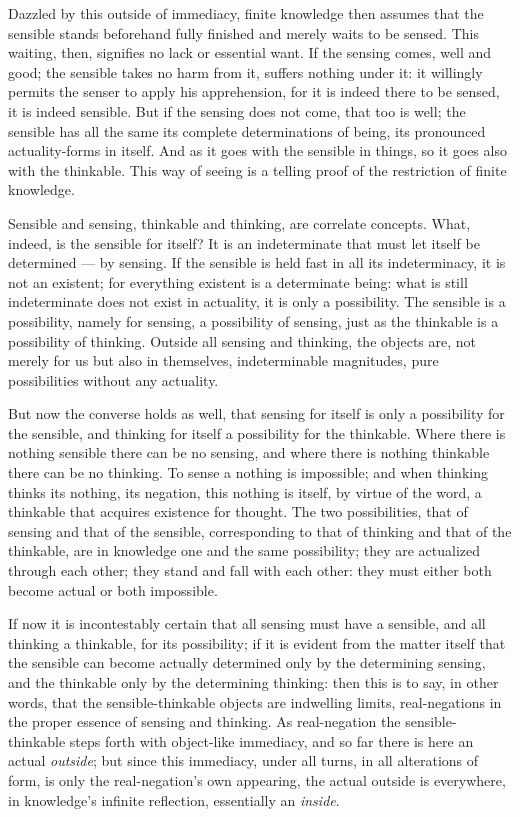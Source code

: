 \documentclass[12pt]{book}
\begin{document}
Dazzled by this outside of immediacy, finite knowledge then assumes
that the sensible stands beforehand fully finished and merely waits
to be sensed. This waiting, then, signifies no lack or essential
want. If the sensing comes, well and good; the sensible takes no
harm from it, suffers nothing under it: it willingly permits the
senser to apply his apprehension, for it is indeed there to be
sensed, it is indeed sensible. But if the sensing does not come,
that too is well; the sensible has all the same its complete
determinations of being, its pronounced actuality-forms in itself.
And as it goes with the sensible in things, so it goes also with the
thinkable. This way of seeing is a telling proof of the restriction
of finite knowledge.

Sensible and sensing, thinkable and thinking, are correlate
concepts. What, indeed, is the sensible for itself? It is an
indeterminate that must let itself be determined --- by sensing. If
the sensible is held fast in all its indeterminacy, it is not an
existent; for everything existent is a determinate being: what is
still indeterminate does not exist in actuality, it is only a
possibility. The sensible is a possibility, namely for sensing, a
possibility of sensing, just as the thinkable is a possibility of
thinking. Outside all sensing and thinking, the objects are, not
merely for us but also in themselves, indeterminable magnitudes,
pure possibilities without any actuality.

But now the converse holds as well, that sensing for itself is only
a possibility for the sensible, and thinking for itself a
possibility for the thinkable. Where there is nothing sensible there
can be no sensing, and where there is nothing thinkable there can be
no thinking. To sense a nothing is impossible; and when thinking
thinks its nothing, its
negation, this nothing is itself, by virtue of the word, a thinkable
that acquires existence for thought. The two possibilities, that of
sensing and that of the sensible, corresponding to that of thinking
and that of the thinkable, are in knowledge one and the same
possibility; they are actualized through each other; they stand and
fall with each other: they must either both become actual or both
impossible.

If now it is incontestably certain that all sensing must have a
sensible, and all thinking a thinkable, for its possibility; if it
is evident from the matter itself that the sensible can become
actually determined only by the determining sensing, and the
thinkable only by the determining thinking: then this is to say, in
other words, that the sensible-thinkable objects are indwelling
limits, real-negations in the proper essence of sensing and
thinking. As real-negation the sensible-thinkable steps forth with
object-like immediacy, and so far there is here an actual
\emph{outside}; but since this immediacy, under all turns, in all
alterations of form, is only the real-negation's own appearing, the
actual outside is everywhere, in knowledge's infinite reflection,
essentially an \emph{inside}.
\end{document}
